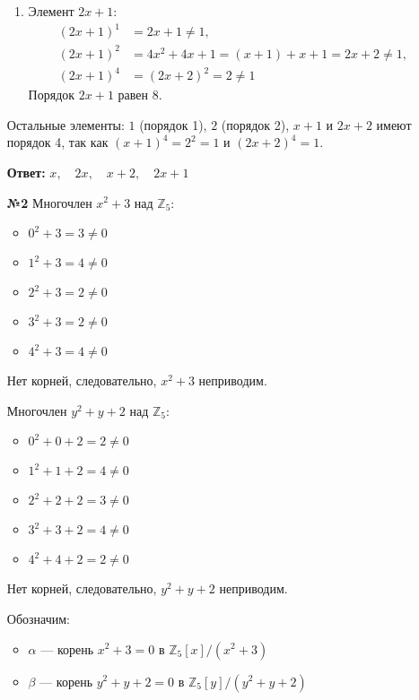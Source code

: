 \documentclass[a4paper]{article}
\begin{document}
\begin{enumerate}
\begin{enumerate}
    \item Элемент $2x + 1$:
      $$
      \begin{aligned}
      (2x + 1)^1 &= 2x + 1 \neq 1, \\
      (2x + 1)^2 &= 4x^2 + 4x + 1 = (x + 1) + x + 1 = 2x + 2 \neq 1, \\
      (2x + 1)^4 &= (2x + 2)^2 = 2 \neq 1
      \end{aligned}
      $$
      Порядок $2x + 1$ равен 8.
  \end{enumerate}
  Остальные элементы:
  $1$ (порядок 1), 
  $2$ (порядок 2), 
  $x + 1$ и $2x + 2$ имеют порядок 4, так как $(x + 1)^4 = 2^2 = 1$ и $(2x + 2)^4 = 1$.

  \textbf{Ответ: } $x, \quad 2x, \quad x + 2, \quad 2x + 1$\\

  \item[\textbf{№2}]Многочлен \(x^2 + 3\) над \(\mathbb{Z}_5\):
  \begin{itemize}
  \item \(0^2 + 3 = 3 \neq 0\)
  \item \(1^2 + 3 = 4 \neq 0\)
  \item \(2^2 + 3 = 2 \neq 0\)
  \item \(3^2 + 3 = 2 \neq 0\)
  \item \(4^2 + 3 = 4 \neq 0\)
  \end{itemize}

  Нет корней, следовательно, \(x^2 + 3\) неприводим.

  Многочлен \(y^2 + y + 2\) над \(\mathbb{Z}_5\):

  \begin{itemize}
    \item \(0^2 + 0 + 2 = 2 \neq 0\)
    \item \(1^2 + 1 + 2 = 4 \neq 0\)
    \item \(2^2 + 2 + 2 = 3 \neq 0\)
    \item \(3^2 + 3 + 2 = 4 \neq 0\)
    \item \(4^2 + 4 + 2 = 2 \neq 0\)
  \end{itemize}

  Нет корней, следовательно, \(y^2 + y + 2\) неприводим.

  Обозначим:
  \begin{itemize}
  \item \(\alpha\) — корень \(x^2 + 3 = 0\) в \(\mathbb{Z}_5[x]/(x^2 + 3)\)
  \item \(\beta\) — корень \(y^2 + y + 2 = 0\) в \(\mathbb{Z}_5[y]/(y^2 + y + 2)\)
  \end{itemize}


\end{enumerate}
\end{document}

